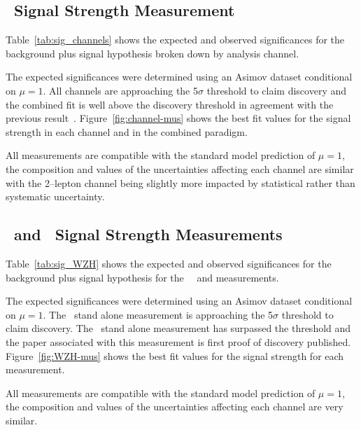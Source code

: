 \subsection{\VH\ Signal Strength Measurement}
Table~\ref{tab:sig_channels} shows the expected and observed significances for
the background plus signal hypothesis broken down by analysis channel.

The expected significances were determined using an Asimov dataset conditional
on $\mu=1$. All channels are approaching the 5$\sigma$ threshold to claim
discovery and the combined fit is well above the discovery threshold in
agreement with the previous result~\cite{vhbb-obs}. Figure~\ref{fig:channel-mus}
shows the best fit values for the signal strength in each channel and in the
combined paradigm.

All measurements are compatible with the standard model prediction of $\mu=1$,
the composition and values of the uncertainties affecting each channel are
similar with the 2--lepton channel being slightly more impacted by statistical
rather than systematic uncertainty.
%
\clearpage
\subsection{\WH\ and \ZH\ Signal Strength Measurements}
Table~\ref{tab:sig_WZH} shows the expected and observed significances for
the background plus signal hypothesis for the \WH\, \ZH\ and \VH measurements.

The expected significances were determined using an Asimov dataset conditional
on $\mu=1$. The \WH\ stand alone measurement is approaching the 5$\sigma$
threshold to claim discovery. The \ZH\ stand alone measurement has surpassed the
threshold and the paper associated with this measurement is first proof of
discovery published. Figure~\ref{fig:WZH-mus}
shows the best fit values for the signal strength for each measurement.

All measurements are compatible with the standard model prediction of $\mu=1$,
the composition and values of the uncertainties affecting each channel are very
similar.
\clearpage

